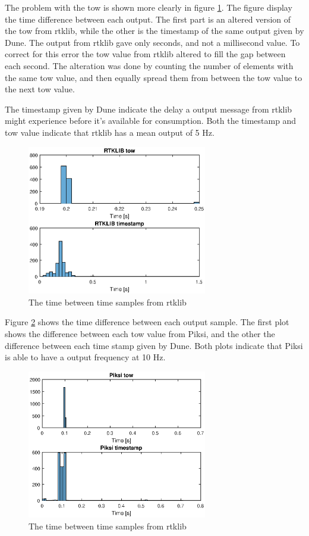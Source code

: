 The problem with the \gls{tow} is shown more clearly in figure \ref{figure:timeRTKwalk1}. The figure display the time difference between each output. The first part is an altered version of the \gls{tow} from rtklib, while the other is the timestamp of the same output given by Dune. The output from rtklib gave only seconds, and not a millisecond value. To correct for this error the \gls{tow} value from rtklib altered to fill the gap between each second. The alteration was done by counting the number of elements with the same \gls{tow} value, and then equally spread them from between the \gls{tow} value to the next \gls{tow} value.

The timestamp given by Dune indicate the delay a output message from rtklib might experience before it's available for consumption. Both the timestamp and \gls{tow} value indicate that rtklib has a mean output of 5 Hz. 
\begin{figure}[H]
	\centering
		\includegraphics[width=0.7\textwidth]{figs/plots/rtktime.eps}
		\caption{The time between time samples from rtklib}
		\label{figure:timeRTKwalk1}
\end{figure}
Figure \ref{figure:timePiksiWalk1} shows the time difference between each output sample. The first plot shows the difference between each \gls{tow} value from Piksi, and the other the difference between each time stamp given by Dune. Both plots indicate that Piksi is able to have a output frequency at 10 Hz.
\begin{figure}[H]
	\centering
		\includegraphics[width=0.7\textwidth]{figs/plots/piksitime.eps}
		\caption{The time between time samples from rtklib}
		\label{figure:timePiksiWalk1}
\end{figure}
